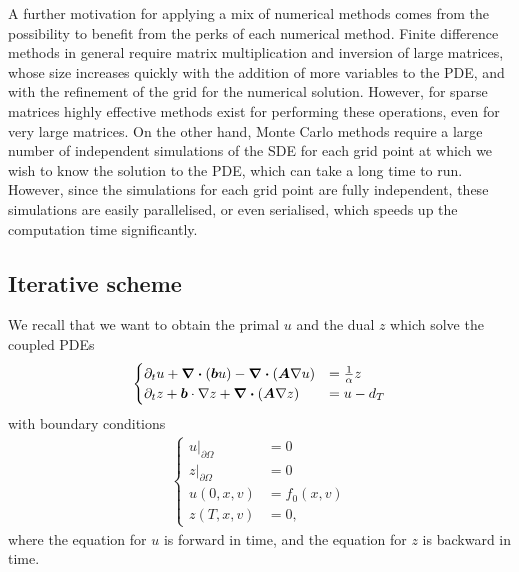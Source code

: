 A further motivation for applying a mix of numerical methods comes from the possibility to benefit from the perks of each numerical method. Finite difference methods in general require matrix multiplication and inversion of large matrices, whose size increases quickly with the addition of more variables to the PDE, and with the refinement of the grid for the numerical solution. However, for sparse matrices highly effective methods exist for performing these operations, even for very large matrices. On the other hand, Monte Carlo methods require a large number of independent simulations of the SDE for each grid point at which we wish to know the solution to the PDE, which can take a long time to run. However, since the simulations for each grid point are fully independent, these simulations are easily parallelised, or even serialised, which speeds up the computation time significantly.

\subsection{Iterative scheme}\label{sec:iterative-scheme}







We recall that we want to obtain the primal $u$ and the dual $z$ which solve the coupled PDEs 
%
\begin{align} 
    \begin{cases} 
        \partial_t u + \div{(\boldsymbol{b}u)} - \div{(\boldsymbol{A} \nabla u)} &= \frac{1}{\alpha} z\\
        \partial_t z + \boldsymbol{b} \cdot \nabla z + \div{(\boldsymbol{A} \nabla z)} &= u - d_T
    \end{cases}
\end{align}
%
with boundary conditions 
%
\begin{align}
    \begin{cases} 
        {u \rvert}_{\partial \Omega} &= 0\\
        {z \rvert}_{\partial \Omega} &= 0\\
        u(0,x,v) &= f_0(x,v)\\
        z(T,x,v) &= 0,
    \end{cases} 
\end{align}
%
where the equation for $u$ is forward in time, and the equation for $z$ is backward in time. 

